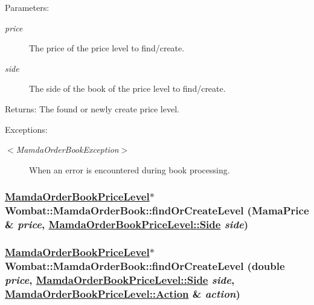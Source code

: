 \begin{Desc}
\item[Parameters:]
\begin{description}
\item[{\em price}]The price of the price level to find/create. \item[{\em side}]The side of the book of the price level to find/create.\end{description}
\end{Desc}
\begin{Desc}
\item[Returns:]The found or newly create price level.\end{Desc}
\begin{Desc}
\item[Exceptions:]
\begin{description}
\item[{\em $<$Mamda\-Order\-Book\-Exception$>$}]When an error is encountered during book processing. \end{description}
\end{Desc}
\hypertarget{classWombat_1_1MamdaOrderBook_fd5ddeb27f947dc20adeea8579a3c7ab}{
\subsubsection[findOrCreateLevel]{\setlength{\rightskip}{0pt plus 5cm}\hyperlink{classWombat_1_1MamdaOrderBookPriceLevel}{Mamda\-Order\-Book\-Price\-Level}$\ast$ Wombat::Mamda\-Order\-Book::find\-Or\-Create\-Level (Mama\-Price \& {\em price}, \hyperlink{classWombat_1_1MamdaOrderBookPriceLevel_384c34b0a74d874b8969dee9b0d3718d}{Mamda\-Order\-Book\-Price\-Level::Side} {\em side})}}
\label{classWombat_1_1MamdaOrderBook_fd5ddeb27f947dc20adeea8579a3c7ab}


\hypertarget{classWombat_1_1MamdaOrderBook_2d6aa1c688aae76f33a16ec1c6419b71}{
\subsubsection[findOrCreateLevel]{\setlength{\rightskip}{0pt plus 5cm}\hyperlink{classWombat_1_1MamdaOrderBookPriceLevel}{Mamda\-Order\-Book\-Price\-Level}$\ast$ Wombat::Mamda\-Order\-Book::find\-Or\-Create\-Level (double {\em price}, \hyperlink{classWombat_1_1MamdaOrderBookPriceLevel_384c34b0a74d874b8969dee9b0d3718d}{Mamda\-Order\-Book\-Price\-Level::Side} {\em side}, \hyperlink{classWombat_1_1MamdaOrderBookPriceLevel_bd3407b4250fc6f7a42d94b6d32e358a}{Mamda\-Order\-Book\-Price\-Level::Action} \& {\em action})}}
\label{classWombat_1_1MamdaOrderBook_2d6aa1c688aae76f33a16ec1c6419b71}


